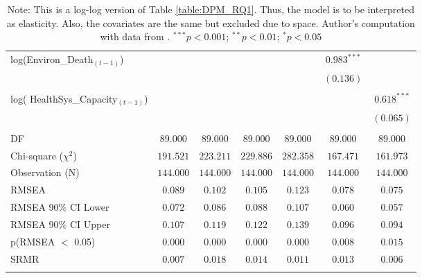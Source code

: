 \begin{longtable}{@{\extracolsep{-3pt}}lcccccc}
log(Environ\_Death$_{(t - 1)}$) &               &                &               &               & $0.983^{***}$ &               \\
                          &               &                &               &               & $(0.136)$     &               \\
                          &&&&&&\\
log( HealthSys\_Capacity$_{(t - 1)}$)     &               &                &               &               &               & $0.618^{***}$ \\
                          &               &                &               &               &               & $(0.065)$     \\
\hline \\[-1.1ex]
DF                        & $89.000$      & $89.000$       & $89.000$      & $89.000$      & $89.000$      & $89.000$      \\
Chi-square ($\chi^2$)                     & $191.521$     & $223.211$      & $229.886$     & $282.358$     & $167.471$     & $161.973$     \\
Observation (N)                         & $144.000$     & $144.000$      & $144.000$     & $144.000$     & $144.000$     & $144.000$     \\
RMSEA                     & $0.089$       & $0.102$        & $0.105$       & $0.123$       & $0.078$       & $0.075$       \\
RMSEA 90\% CI Lower            & $0.072$       & $0.086$        & $0.088$       & $0.107$       & $0.060$       & $0.057$       \\
RMSEA 90\% CI Upper            & $0.107$       & $0.119$        & $0.122$       & $0.139$       & $0.096$       & $0.094$       \\
p(RMSEA $<$ 0.05)              & $0.000$       & $0.000$        & $0.000$       & $0.000$       & $0.008$       & $0.015$       \\
SRMR                     & $0.007$       & $0.018$        & $0.014$       & $0.011$       & $0.013$       & $0.006$       \\
\hline

\caption*{\scriptsize{Note: This is a log-log version of Table \ref{table:DPM_RQ1}. Thus, the model is to be interpreted as elasticity. Also, the covariates are the same but excluded due to space. Author's computation with data from \textcite{wdi_world_2023, unsdg_sustainable_2023}. $^{***}p<0.001$; $^{**}p<0.01$; $^{*}p<0.05$}}
\label{table:DPM_RQ1_Log}
\end{longtable}



